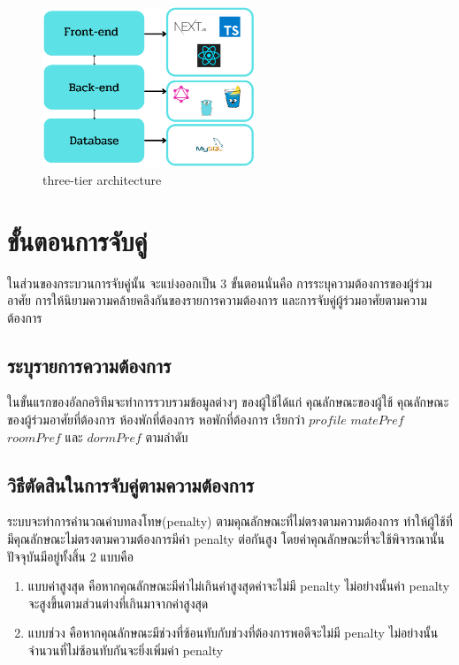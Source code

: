 
\begin{figure}[h]
  \begin{center}
    \includegraphics[width=2.5in]{photo.old/threetierarch.png}
  \end{center}
  \caption{three-tier architecture}
  \label{fig:three-tier}
\end{figure}

\section{ขั้นตอนการจับคู่}
ในส่วนของกระบวนการจับคู่นั้น จะแบ่งออกเป็น 3 ขั้นตอนนั่นคือ การระบุความต้องการของผู้ร่วมอาศัย การให้นิยามความคล้ายคลึงกันของรายการความต้องการ
และการจับคู่ผู้ร่วมอาศัยตามความต้องการ
\subsection{ระบุรายการความต้องการ}
ในขั้นแรกของอัลกอริทึมจะทำการรวบรวมข้อมูลต่างๆ ของผู้ใช้ได้แก่ 
คุณลักษณะของผู้ใช้ คุณลักษณะของผู้ร่วมอาศัยที่ต้องการ ห้องพักที่ต้องการ หอพักที่ต้องการ เรียกว่า $profile$ $matePref$ $roomPref$
และ $dormPref$ ตามลำดับ
\subsection{วิธีตัดสินในการจับคู่ตามความต้องการ}
ระบบจะทำการคำนวณค่าบทลงโทษ(penalty) ตามคุณลักษณะที่ไม่ตรงตามความต้องการ ทำให้ผู้ใช้ที่มีคุณลักษณะไม่ตรงตามความต้องการมีค่า penalty ต่อกันสูง
โดยค่าคุณลักษณะที่จะใช้พิจารณานั้นปัจจุบันมีอยู่ทั้งสิ้น 2 แบบคือ
\begin{enumerate}
  \item แบบค่าสูงสุด คือหากคุณลักษณะมีค่าไม่เกินค่าสูงสุดค่าจะไม่มี penalty ไม่อย่างนั้นค่า penalty จะสูงขึ้นตามส่วนต่างที่เกินมาจากค่าสูงสุด
  \item แบบช่วง คือหากคุณลักษณะมีช่วงที่ซ้อนทับกับช่วงที่ต้องการพอดีจะไม่มี penalty ไม่อย่างนั้นจำนวนที่ไม่ซ้อนทับกันจะยิ่งเพิ่มค่า penalty
\end{enumerate}
